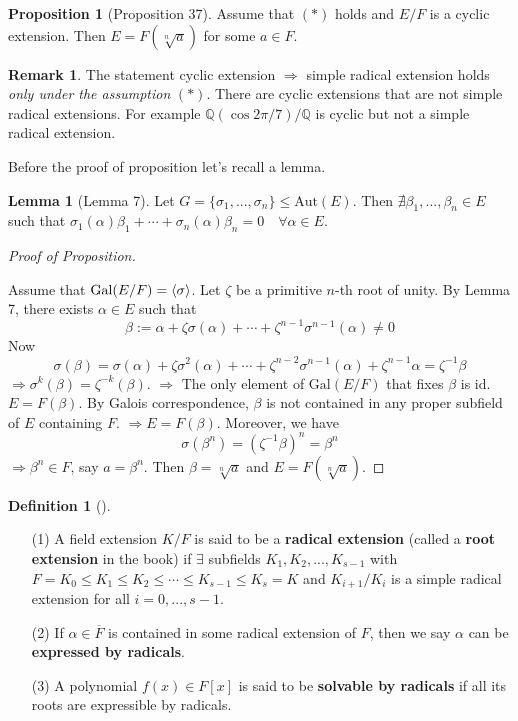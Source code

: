 \documentclass{article}
\theoremstyle{definition}
\newtheorem{lem}{Lemma}
\newtheorem{dfn}{Definition}
\newtheorem{rem}{Remark}
\newtheorem{prop}{Proposition}
\newenvironment{proofs}[1][\proofname]{%
  \begin{proof}[#1]$ $\par\nobreak\ignorespaces
}{%
  \end{proof}
}
\newenvironment{dfns}[1][]{%
  \begin{dfn}[#1]$ $\par\nobreak\ignorespaces
}{%
  \end{dfn}
}
\newcommand{\QQ}{\mathbb Q}
\newcommand{\Ra}{\Rightarrow}
\newcommand{\Gal}{\text{Gal}}
\newcommand{\id}{\text{id}}
\begin{document}
\begin{prop}[Proposition 37]
	Assume that $(*)$ holds and $E/F$ is a cyclic extension.
	Then $E = F(\sqrt[n]{a})$ for some $a \in F$.
\end{prop}

\begin{rem}
	The statement cyclic extension $\Ra$ simple radical extension holds \textit{only under the assumption} $(*)$.
	There are cyclic extensions that are not simple radical extensions.
	For example $\QQ(\cos 2 \pi/7)/\QQ$ is cyclic but not a simple radical extension.
\end{rem}

Before the proof of proposition let's recall a lemma.

\begin{lem}[Lemma 7]
	Let $G = \{\sigma_1, ..., \sigma_n\} \leq \text{Aut}(E)$.
	Then $\nexists \beta_1, ..., \beta_n \in E$ such that $\sigma_1(\alpha) \beta_1 + \cdots + \sigma_n(\alpha) \beta_n = 0 \quad \forall \alpha \in E$.
\end{lem}

\begin{proofs}[Proof of Proposition]
	Assume that $\Gal(E/F) = \ev{\sigma}$.
	Let $\zeta$ be a primitive $n$-th root of unity.
	By Lemma 7, there exists $\alpha \in E$ such that
	\[
		\beta := \alpha + \zeta \sigma(\alpha) + \cdots + \zeta^{n -1} \sigma^{n - 1} (\alpha) \neq 0
	\]
	Now 
	\[
		\sigma(\beta) = \sigma(\alpha) + \zeta \sigma^2 (\alpha) + \cdots + \zeta^{n - 2} \sigma^{n - 1} (\alpha) + \zeta^{n - 1} \alpha = \zeta^{-1} \beta
	\]
	$\Ra \sigma^k(\beta) = \zeta^{-k}(\beta)$.
	$\Ra$ The only element of $\Gal(E/F)$ that fixes $\beta$ is $\id$.
	$E = F(\beta)$.
	By Galois correspondence, $\beta$ is not contained in any proper subfield of $E$ containing $F$.
	$\Ra E = F(\beta)$.
	Moreover, we have
	\[
		\sigma(\beta^n) = (\zeta^{-1} \beta)^n = \beta^n
	\]
	$\Ra \beta^n \in F$, say $a = \beta^n$.
	Then $\beta = \sqrt[n]{a}$ and $E = F(\sqrt[n]{a})$.
\end{proofs}

\begin{dfns}
	\begin{enumerate}
		\item[(1)] A field extension $K/F$ is said to be a \textbf{radical extension} (called a \textbf{root extension} in the book) if $\exists$ subfields $K_1, K_2, ..., K_{s - 1}$ with $F = K_0 \leq K_1 \leq K_2 \leq \cdots \leq K_{s - 1} \leq K_s = K$ and $K_{i + 1}/K_i$ is a simple radical extension for all $i = 0, ..., s - 1$.

		\item[(2)] If $\alpha \in \overline{F}$ is contained in some radical extension of $F$, then we say $\alpha$ can be \textbf{expressed by radicals}.

		\item[(3)] A polynomial $f(x) \in F[x]$ is said to be \textbf{solvable by radicals} if all its roots are expressible by radicals.
	\end{enumerate}
\end{dfns}
\end{document}
